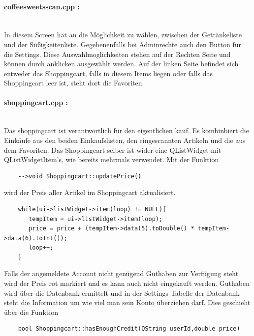 \documentclass[11pt,a4paper]{article} %
\begin{document}
\paragraph{coffeesweetsscan.cpp :} $\;$ \\
	In diesem Screen hat an die Möglichkeit zu wählen, zwischen der Getränkeliste und der Süßigkeitenliste. Gegebenenfalls bei Adminrechte auch den Button für die Settings.
	Diese Auswahlmoglichkeiten stehen auf der Rechten Seite und können durch anklicken ausgewählt werden. 
	Auf der linken Seite befindet sich entweder das Shoppingcart, falls in diesem Items liegen oder falls das Shoppingcart leer ist, steht dort die Favoriten.
\par	
\paragraph{shoppingcart.cpp :} $\;$ \\
	Das shoppingcart ist verantwortlich für den eigentlichen kauf. Es kombinbiert die Einkäufe aus den beiden Einkaufslisten, den eingescannten Artikeln und die aus dem Favoriten.
	Das Shoppingcart selber ist wider eine QListWidget mit QListWidgetItem's, wie bereits mehrmals verwendet.
	Mit der Funktion 
		\begin{frame}

\begin{lstlisting}
	-->void Shoppingcart::updatePrice()
	    \end{lstlisting}
\end{frame}
	 wird der Preis aller Artikel im Shoppingcart aktualisiert. 
	\begin{frame}

\begin{lstlisting}
	while(ui->listWidget->item(loop) != NULL){
       tempItem = ui->listWidget->item(loop);
       price = price + (tempItem->data(5).toDouble() * tempItem->data(6).toInt());
       loop++;
    }
    \end{lstlisting}
\end{frame}
	Falls der angemeldete Account nicht genügend Guthaben zur Verfügung steht wird der Preis rot markiert und es kann auch nicht eingekauft werden.
	Guthaben wird über die Datenbank ermittelt und in der Settings-Tabelle der Datenbank steht die Information um wie viel man sein Konto überziehen darf.
	Dies geschieht über die Funktion
	 \begin{frame}

\begin{lstlisting}
	bool Shoppingcart::hasEnoughCredit(QString userId,double price)
		\end{lstlisting}
\end{frame}
\end{document}
